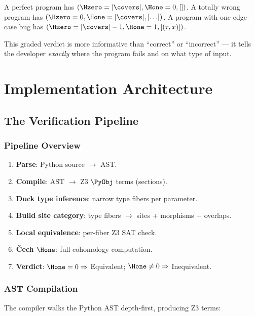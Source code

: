 A perfect program has $(\Hzero = |\covers|, \Hone = 0, [])$.
A totally wrong program has $(\Hzero = 0, \Hone = |\covers|,
[\ldots])$.
A program with one edge-case bug has
$(\Hzero = |\covers| - 1, \Hone = 1, [(\tau, x)])$.

This graded verdict is more informative than ``correct'' or
``incorrect'' --- it tells the developer \emph{exactly} where the
program fails and on what type of input.


\part{Implementation Architecture}

\chapter{The Verification Pipeline}
\label{ch:pipeline}

\section{Pipeline Overview}

\begin{enumerate}
  \item \textbf{Parse}: Python source $\to$ AST.
  \item \textbf{Compile}: AST $\to$ Z3 $\PyObj$ terms (sections).
  \item \textbf{Duck type inference}: narrow type fibers per parameter.
  \item \textbf{Build site category}: type fibers $\to$ sites +
    morphisms + overlaps.
  \item \textbf{Local equivalence}: per-fiber Z3 SAT check.
  \item \textbf{\v{C}ech $\Hone$}: full cohomology computation.
  \item \textbf{Verdict}: $\Hone = 0 \Rightarrow$ Equivalent;
    $\Hone \neq 0 \Rightarrow$ Inequivalent.
\end{enumerate}

\section{AST Compilation}

The compiler walks the Python AST depth-first, producing Z3 terms:

